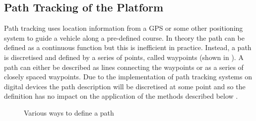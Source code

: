 \documentclass[main.tex]{subfiles}
\begin{document}
\subsection{Path Tracking of the Platform}
Path tracking uses location information from a GPS or some other positioning system to guide a vehicle along a pre-defined course. In theory the path can be defined as a continuous function but this is inefficient in practice. Instead, a path is discretised and defined by a series of points, called waypoints (shown in ). A path can either be described as lines connecting the waypoints or as a series of closely spaced waypoints. Due to the implementation of path tracking systems on digital devices the path description will be discretised at some point and so the definition has no impact on the application of the methods described below \parencite{Giesbrecht2005}.

\begin{figure}[htbp]
\centering
{}\hspace{1em}%
\hspace{1em}%
\caption{Various ways to define a path \parencite{Giesbrecht2005}}
\end{figure}
\end{document}
